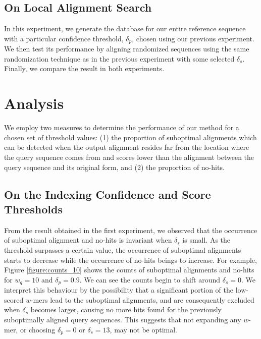 \documentclass{article}
\begin{document}
\subsection{On Local Alignment Search}

In this experiment, we generate the database for our entire reference sequence with a particular confidence threshold, $\delta_p$, chosen using our previous experiment. We then test its performance by aligning randomized sequences using the same randomization technique as in the previous experiment with some selected $\delta_s$. Finally, we compare the result in both experiments. 

\section{Analysis}

We employ two measures to determine the performance of our method for a chosen set of threshold values: (1) the proportion of suboptimal alignments which can be detected when the output alignment resides far from the location where the query sequence comes from and scores lower than the alignment between the query sequence and its original form, and (2) the proportion of no-hits. 

\subsection{On the Indexing Confidence and Score Thresholds}

From the result obtained in the first experiment, we observed that the occurrence of suboptimal alignment and no-hits is invariant when $\delta_s$ is small. As the threshold surpasses a certain value, the occurrence of suboptimal alignments starts to decrease while the occurrence of no-hits beings to increase. For example, Figure \ref{figure:counts_10} shows the counts of suboptimal alignments and no-hits for $w_q = 10$ and $\delta_p = 0.9$. We can see the counts begin to shift around $\delta_s = 0$. We interpret this behaviour by the possibility that a significant portion of the low-scored $w$-mers lead to the suboptimal alignments, and are consequently excluded when $\delta_s$ becomes larger, causing no more hits found for the previously suboptimally aligned query sequences. This suggests that not expanding any $w$-mer, or choosing $\delta_p = 0$ or $\delta_s = 13$, may not be optimal. 
\end{document}
